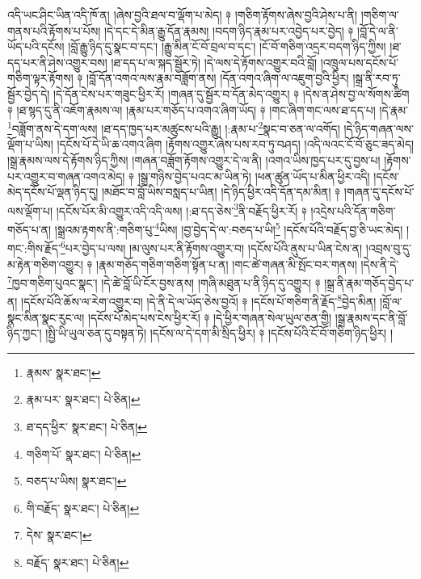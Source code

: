 འདི་ཡང་ཤིང་ཡིན་འདི་ཁོ་ན། །ཞེས་བྱའི་ཐལ་བ་ལྡོག་པ་མེད། ༈ །གཅིག་རྟོགས་ཞེས་བྱའི་ཤེས་པ་ནི། །གཅིག་ལ་གནས་པའི་རྟོགས་པ་པོས། །དེ་དང་དེ་མིན་རྒྱུ་དོན་རྣམས། །བདག་ཉིད་རྣམ་པར་འབྱེད་པར་བྱེད། ༈ །བློ་དེ་ལ་ནི་ཡོད་པའི་དངོས། །བློ་རྒྱུ་ཉིད་དུ་སྣང་བ་དང་། །རྒྱུ་མིན་ངོ་བོ་བྲལ་བ་དང་། །ངོ་བོ་གཅིག་འདྲར་བདག་ཉིད་ཀྱིས། །ཐ་དད་པར་ནི་ཤེས་འགྱུར་བས། །ཐ་དད་པ་ལ་སྐད་སྦྱོར་ཏེ། །དེ་ལས་དེ་རྟོགས་འགྱུར་བའི་བློ། །འཁྲུལ་པས་དངོས་པོ་གཅིག་ལྟར་རྟོགས། ༈ །བློ་དོན་འགའ་ལས་རྣམ་བཟློག་ནས། །དོན་འགའ་ཞིག་ལ་འཇུག་བྱའི་ཕྱིར། །སྒྲ་ནི་རབ་ཏུ་སྦྱོར་བྱེད་དེ། །དེ་དོན་ངེས་པར་གཟུང་ཕྱིར་རོ། །གཞན་དུ་སྦྱོར་བ་དོན་མེད་འགྱུར། ༈ །དེས་ན་ཤེས་བྱ་ལ་སོགས་ཚིག ༈ །ཐ་སྙད་དུ་ནི་འཇོག་རྣམས་ལ། །རྣམ་པར་གཅོད་པ་འགའ་ཞིག་ཡོད། ༈ །གང་ཞིག་གང་ལས་ཐ་དད་པ། །དེ་རྣམ་\footnote{རྣམས་  སྣར་ཐང་། }བཟློག་ནས་དེ་དག་ལས། །ཐ་དད་ཁྱད་པར་མཚུངས་པའི་རྒྱུ། །:རྣམ་པ་\footnote{རྣམ་པར་  སྣར་ཐང་།  པེ་ཅིན། }སྣང་བ་ཅན་ལ་འགོད། །དེ་ཉིད་གཞན་ལས་ལྡོག་པ་ཡིས། །དངོས་པོ་དེ་ཡི་ཆ་འགའ་ཞིག །རྟོགས་འགྱུར་ཞེས་པས་རབ་ཏུ་བཤད། །འདི་ལའང་ངོ་བོ་ཅུང་ཟད་མེད། །སྒྲ་རྣམས་ལས་དེ་རྟོགས་ཉིད་ཀྱིས། །གཞན་བཟློག་རྟོགས་འགྱུར་དེ་ལ་ནི། །འགའ་ཡིས་ཁྱད་པར་དུ་བྱས་པ། །རྟོགས་པར་འགྱུར་བ་གཞན་འགའ་མེད། ༈ །སྒྲ་གཉིས་བྱེད་པའང་མ་ཡིན་ཏེ། །ཕན་ཚུན་ཡོད་པ་མིན་ཕྱིར་འདི། །དངོས་མེད་དངོས་པོ་ལྡན་ཉིད་དུ། །མཐོང་བ་བློ་ཡིས་བསླད་པ་ཡིན། །དེ་ཉིད་ཕྱིར་འདི་དོན་དམ་མིན། ༈ །གཞན་དུ་དངོས་པོ་ལས་ལྡོག་པ། །དངོས་པོར་མི་འགྱུར་འདི་འདི་ལས། །:ཐ་དད་ཅེས་\footnote{ཐ་དད་ཕྱིར་  སྣར་ཐང་།  པེ་ཅིན། }ནི་བརྗོད་ཕྱིར་རོ། ༈ །འདྲེས་པའི་དོན་གཅིག་གཅོད་པ་ན། །སྒྲའམ་རྟགས་ནི་:གཅིག་པུ་\footnote{གཅིག་པོ་  སྣར་ཐང་།  པེ་ཅིན། }ཡིས། །བྱ་བྱེད་དེ་ལ་:བཅད་པ་ཡི།\footnote{བཅད་པ་ཡིས།  སྣར་ཐང་། } །དངོས་པོའི་བརྗོད་བྱ་ཅི་ཡང་མེད། །གང་:གིས་རྗོད་\footnote{གི་བརྗོད་  སྣར་ཐང་།  པེ་ཅིན། }པར་བྱེད་པ་ལས། །མ་ལུས་པར་ནི་རྟོགས་འགྱུར་བ། །དངོས་པོའི་ནུས་པ་ཡིན་ངེས་ན། །འབྲས་བུ་དུ་མ་རྟེན་གཅིག་འགྱུར། ༈ །རྣམ་གཅོད་གཅིག་གཅིག་སྟོན་པ་ན། །གང་ཚེ་གཞན་མི་སྤོང་བར་གནས། །དེས་ནི་དེ་\footnote{དེས་  སྣར་ཐང་། }ཁྱབ་གཅིག་པུའང་སྣང་། །དེ་ཚེ་བློ་ཡི་ངོར་བྱས་ནས། །གཞི་མཐུན་པ་ནི་ཉིད་དུ་འགྱུར། ༈ །སྒྲ་ནི་རྣམ་གཅོད་བྱེད་པ་ན། །དངོས་པོའི་ཆོས་ལ་རེག་འགྱུར་བ། །དེ་ནི་དེ་ལ་ཡོད་ཅེས་བྱའོ། ༈ །དངོས་པོ་གཅིག་ནི་རྗོད་\footnote{བརྗོད་  སྣར་ཐང་།  པེ་ཅིན། }བྱེད་མིན། །བློ་ལ་སྣང་མིན་སྣང་རུང་ལ། །དངོས་པོ་མེད་པས་ངེས་ཕྱིར་རོ། ༈ །དེ་ཕྱིར་གཞན་སེལ་ཡུལ་ཅན་གྱི། །སྒྲ་རྣམས་དང་ནི་བློ་ཉིད་ཀྱང་། །སྤྱི་ཡི་ཡུལ་ཅན་དུ་བསྟན་ཏེ། །དངོས་ལ་དེ་དག་མི་སྲིད་ཕྱིར། ༈ །དངོས་པོའི་ངོ་བོ་གཅིག་ཉིད་ཕྱིར། །
